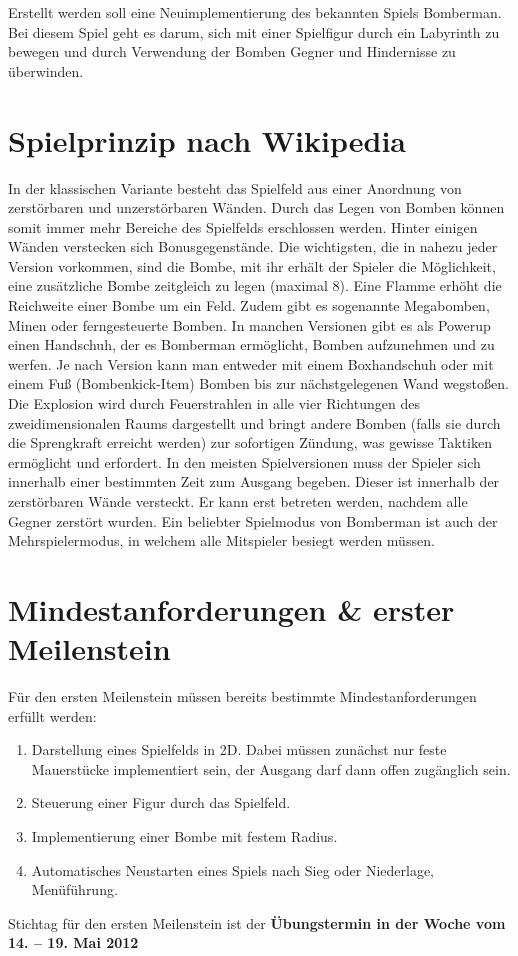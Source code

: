 \documentclass{programmierpraktikum}
\subtitle{Bomberman}
\begin{document}
\maketitle
Erstellt werden soll eine Neuimplementierung des bekannten Spiels Bomberman. Bei diesem Spiel
geht es darum, sich mit einer Spielfigur durch ein Labyrinth zu bewegen und durch Verwendung der
Bomben Gegner und Hindernisse zu überwinden.
%
\section{Spielprinzip nach Wikipedia}
In der klassischen Variante besteht das Spielfeld aus einer Anordnung von zerstörbaren und
unzerstörbaren Wänden. Durch das Legen von Bomben können somit immer mehr Bereiche des
Spielfelds erschlossen werden. Hinter einigen Wänden verstecken sich Bonusgegenstände. Die
wichtigsten, die in nahezu jeder Version vorkommen, sind die Bombe, mit ihr erhält der Spieler die
Möglichkeit, eine zusätzliche Bombe zeitgleich zu legen (maximal 8). Eine Flamme erhöht die
Reichweite einer Bombe um ein Feld. Zudem gibt es sogenannte Megabomben, Minen oder
ferngesteuerte Bomben. In manchen Versionen gibt es als Powerup einen Handschuh, der es
Bomberman ermöglicht, Bomben aufzunehmen und zu werfen. Je nach Version kann man entweder
mit einem Boxhandschuh oder mit einem Fuß (Bombenkick-Item) Bomben bis zur nächstgelegenen
Wand wegstoßen.
Die Explosion wird durch Feuerstrahlen in alle vier Richtungen des zweidimensionalen Raums
dargestellt und bringt andere Bomben (falls sie durch die Sprengkraft erreicht werden) zur
sofortigen Zündung, was gewisse Taktiken ermöglicht und erfordert. In den meisten Spielversionen
muss der Spieler sich innerhalb einer bestimmten Zeit zum Ausgang begeben. Dieser ist innerhalb
der zerstörbaren Wände versteckt. Er kann erst betreten werden, nachdem alle Gegner zerstört
wurden.
Ein beliebter Spielmodus von Bomberman ist auch der Mehrspielermodus, in welchem alle
Mitspieler besiegt werden müssen.
%
\section{Mindestanforderungen \& erster Meilenstein}
Für den ersten Meilenstein müssen bereits bestimmte Mindestanforderungen erfüllt werden:
\begin{enumerate}
  \item Darstellung eines Spielfelds in 2D. Dabei müssen zunächst nur feste Mauerstücke implementiert sein, der Ausgang darf dann offen zugänglich sein.
  \item Steuerung einer Figur durch das Spielfeld.
  \item Implementierung einer Bombe mit festem Radius.
  \item Automatisches Neustarten eines Spiels nach Sieg oder Niederlage, Menüführung.
\end{enumerate}
Stichtag für den ersten Meilenstein ist der \textbf{Übungstermin in der Woche vom 14. -- 19. Mai 2012}
\end{document}
